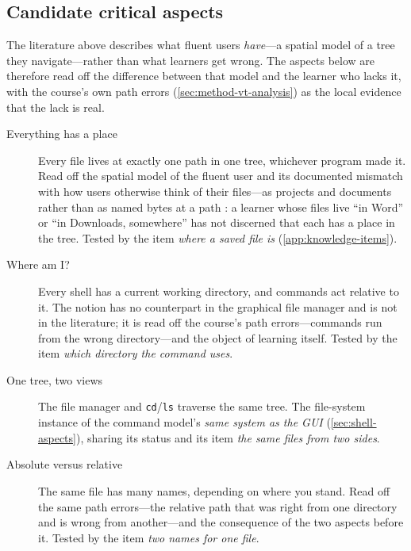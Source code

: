 \subsection{Candidate critical aspects}
\label{sec:filesystem-aspects}

The literature above describes what fluent users \emph{have}---a spatial
model of a tree they navigate---rather than what learners get wrong.
The aspects below are therefore read off the difference between that
model and the learner who lacks it, with the course's own path errors
(\cref{sec:method-vt-analysis}) as the local evidence that the lack is
real.

\begin{description}
  \item[Everything has a place]
    Every file lives at exactly one path in one tree, whichever program
    made it.
    Read off the spatial model of the fluent user
    \autocite{Bergman2008Navigation,Benn2015BrainFolders} and its
    documented mismatch with how users otherwise think of their
    files---as projects and documents rather than as named bytes at a
    path \autocite{May2019FileLifecycle}: a learner whose files live
    \enquote{in Word} or \enquote{in Downloads, somewhere} has not
    discerned that each has a place in the tree.
    Tested by the item \emph{where a saved file is}
    (\cref{app:knowledge-items}).
  \item[Where am I?]
    Every shell has a current working directory, and commands act
    relative to it.
    The notion has no counterpart in the graphical file manager and is
    not in the literature; it is read off the course's path
    errors---commands run from the wrong directory---and the object of
    learning itself.
    Tested by the item \emph{which directory the command uses}.
  \item[One tree, two views]
    The file manager and \texttt{cd}/\texttt{ls} traverse the same tree.
    The file-system instance of the command model's \emph{same system as
    the GUI} (\cref{sec:shell-aspects}), sharing its status and its item
    \emph{the same files from two sides}.
  \item[Absolute versus relative]
    The same file has many names, depending on where you stand.
    Read off the same path errors---the relative path that was right
    from one directory and is wrong from another---and the consequence
    of the two aspects before it.
    Tested by the item \emph{two names for one file}.
\end{description}


